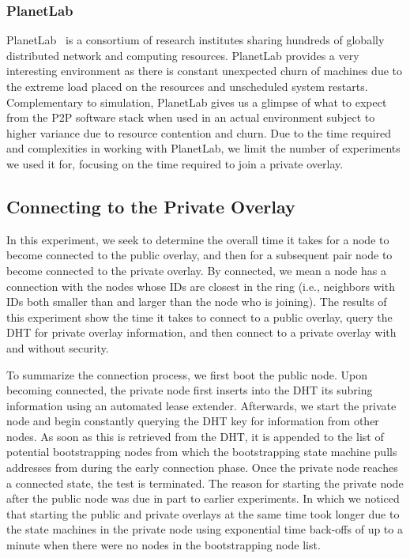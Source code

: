 \documentclass[conference]{IEEEtran}
\begin{document}
\subsubsection{PlanetLab}
PlanetLab~\cite{planetlab} is a consortium of research institutes sharing
hundreds of globally distributed network and computing resources.  PlanetLab
provides a very interesting environment as there is constant unexpected churn
of machines due to the extreme load placed on the resources and unscheduled system restarts.
Complementary to simulation, PlanetLab gives us a glimpse of what to expect
from the P2P software stack when used in an actual environment subject to higher
variance due to resource contention and churn.  Due to the time required and
complexities in working with PlanetLab, we limit the number of experiments we
used it for, focusing on the time required to join a private overlay.

\subsection{Connecting to the Private Overlay}
In this experiment, we seek to determine the overall time
it takes for a node to become connected to the public overlay, and then for a
subsequent pair node to become connected to the private overlay.  By connected, we
mean a node has a connection with the nodes whose IDs are closest in the ring (i.e., neighbors with IDs both smaller
than and larger than the node who is joining).  The results of this experiment
show the time it takes to connect to a public overlay, query the DHT for private overlay
information, and then connect to a private overlay with and without security.

To summarize the connection process, we first boot the public node.  Upon
becoming connected, the private node first inserts into the DHT its 
subring information using an automated lease extender.  Afterwards, we
start the private node and begin constantly querying the DHT key for information
from other nodes.  As soon as this is retrieved from the DHT, it is appended to the list of
potential bootstrapping nodes from which the bootstrapping state machine pulls addresses
from during the early connection phase.  Once the private node
reaches a connected state, the test is terminated.  The reason for starting
the private node after the public node was due in part to earlier experiments.
In which we noticed that starting the public and private overlays at the same time took
longer due to the state machines in the private node using exponential time
back-offs of up to a minute when there were no nodes in the bootstrapping node list.
\end{document}
